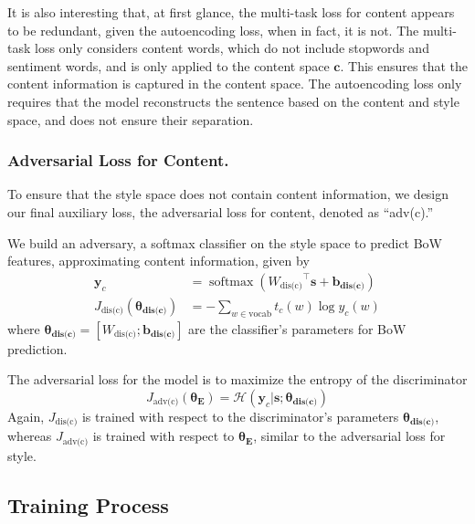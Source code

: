 \documentclass[letterpaper]{article} %
\newcommand{\loss}[1]{J_{\text{#1}}}
\newcommand{\nnweight}[1]{\bm{\theta_{\text{#1}}}}
\newcommand{\weight}[1]{W_{\text{#1}}}
\newcommand{\bias}[1]{\bm{b_{\text{#1}}}}
\begin{document}
It is also interesting that, at first glance, the multi-task loss for content appears to be redundant, given the autoencoding loss, when in fact, it is not. The multi-task loss only considers content words, which do not include stopwords and sentiment words, and is only applied to the content space $\bm c$. This ensures that the content information is captured in the content space. The autoencoding loss only requires that the model reconstructs the sentence based on the content and style space, and does not ensure their separation.

\subsubsection{Adversarial Loss for Content.} \label{ssec:adversarial-content-objective}

To ensure that the style space does not contain content information, we design our final auxiliary loss, the adversarial loss for content, denoted as ``adv(c).''

We build an adversary, a softmax classifier on the style space to predict BoW features, approximating content information, given by
\begin{align}
	\label{eqn:adv-bow-disc-loss}
	\bm y_c                          & = \operatorname{softmax}({\weight{dis(c)}}^\top \bm s + \bias{dis(c)}) \\
	\loss{dis(c)}(\nnweight{dis(c)}) & = - \sum\nolimits_{w\in\text{vocab}} t_c(w)\log y_c(w)
\end{align}
where $\nnweight{dis(c)}=[\weight{dis(c)}; \bias{dis(c)}]$ are the classifier's parameters for BoW prediction.

The adversarial loss for the model is to maximize the entropy of the discriminator
\begin{equation}
	\loss{adv(c)}(\nnweight{E}) = \mathcal{H}(\bm y_c | \bm s; \nnweight{dis(c)})
\end{equation}
Again, $\loss{dis(c)}$ is trained with respect to the discriminator's parameters $\nnweight{dis(c)}$, whereas $\loss{adv(c)}$ is trained with respect to $\nnweight{E}$, similar to the adversarial loss for style.



\subsection{Training Process}
\end{document}
